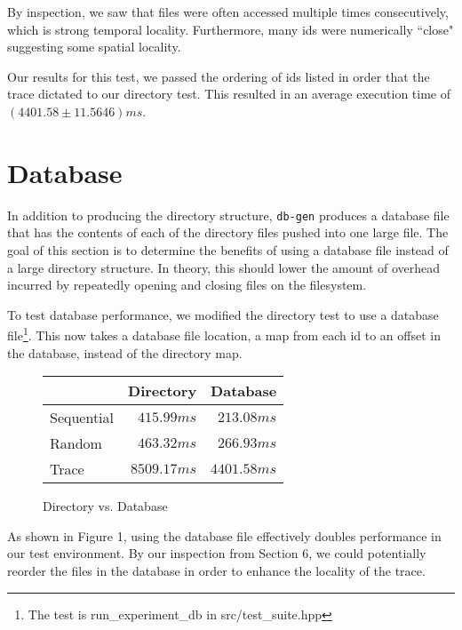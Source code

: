 \documentclass[notitlepage, twocolumn]{article}
\begin{document}
By inspection, we saw that files were often accessed multiple times consecutively, which is strong temporal locality.
Furthermore, many ids were numerically ``close" suggesting some spatial locality.

Our results for this test, we passed the ordering of ids listed in order that the trace dictated to our directory test.
This resulted in an average execution time of $(4401.58 \pm 11.5646)ms$.

\section{Database}

In addition to producing the directory structure, \verb|db-gen| produces a database file that has the contents of each of the directory files pushed into one large file.
The goal of this section is to determine the benefits of using a database file instead of a large directory structure.
In theory, this should lower the amount of overhead incurred by repeatedly opening and closing files on the filesystem.

To test database performance, we modified the directory test to use a database file\footnote{The test is run\_experiment\_db in src/test\_suite.hpp}.
This now takes a database file location, a map from each id to an offset in the database, instead of the directory map.
\begin{figure}[h!]
\centering
\begin{tabular}{l|r|r}
&Directory&Database\\\hline
Sequential&$415.99ms$&$213.08ms$\\\hline
Random&$463.32ms$&$266.93ms$\\\hline
Trace&$8509.17ms$&$4401.58ms$
\end{tabular}
\caption{Directory vs. Database}
\end{figure}
As shown in Figure 1, using the database file effectively doubles performance in our test environment.
By our inspection from Section 6, we could potentially reorder the files in the database in order to enhance the locality of the trace.
\end{document}
